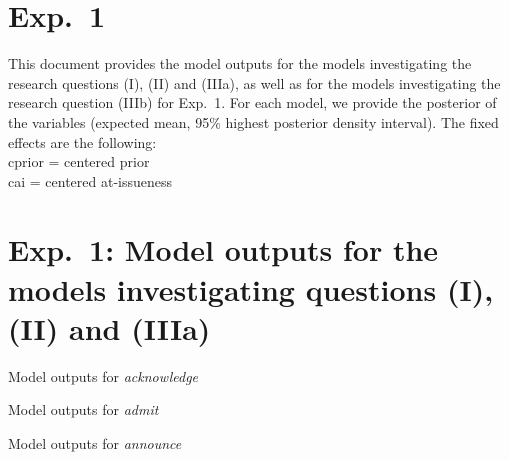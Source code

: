 \documentclass[11pt,fleqn]{article}
\newcommand{\6}{\mbox{$[\hspace*{-.6mm}[$}}
\newcommand{\9}{\mbox{$]\hspace*{-.6mm}]$}}
\begin{document}
\section*{Exp.~1}

This document provides the model outputs for the models investigating the research questions (I), (II) and (IIIa), as well as for the models investigating the research question (IIIb) for Exp.~1. For each model, we provide the posterior of the variables (expected mean, 95\% highest posterior density interval). The fixed effects are the following:
\\ cprior = centered prior
\\ cai = centered at-issueness

\section*{Exp.~1: Model outputs for the models investigating questions (I), (II) and (IIIa)}

\begin{table}[htbp]
\centering

  

\caption{Model outputs for {\em acknowledge}}
\end{table}

\begin{table}[htbp]
\centering

  

\caption{Model outputs for {\em admit}}
\end{table}

\begin{table}[htbp]
\centering

  

\caption{Model outputs for {\em announce}}
\end{table}
\end{document}

